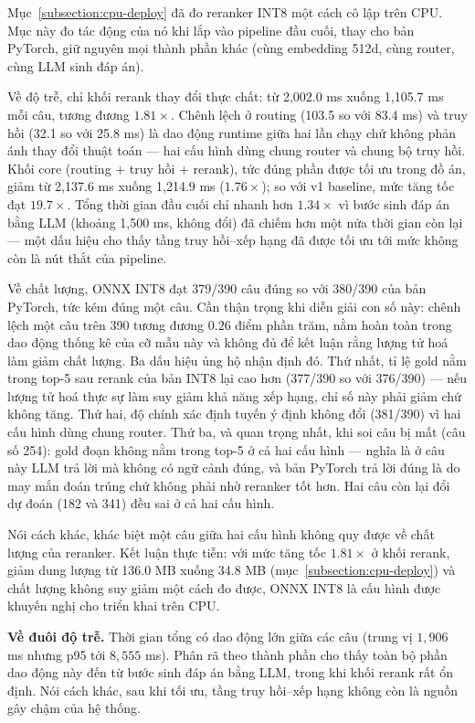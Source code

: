 \documentclass[../DoAn.tex]{subfiles}
\begin{document}
Mục~\ref{subsection:cpu-deploy} đã đo reranker INT8 một cách cô lập trên CPU. Mục này đo tác động của nó khi lắp vào pipeline đầu cuối, thay cho bản PyTorch, giữ nguyên mọi thành phần khác (cùng embedding 512d, cùng router, cùng LLM sinh đáp án).

Về độ trễ, chỉ khối rerank thay đổi thực chất: từ 2,002.0 ms xuống 1,105.7 ms mỗi câu, tương đương $1.81\times$. Chênh lệch ở routing (103.5 so với 83.4 ms) và truy hồi (32.1 so với 25.8 ms) là dao động runtime giữa hai lần chạy chứ không phản ánh thay đổi thuật toán --- hai cấu hình dùng chung router và chung bộ truy hồi. Khối core (routing + truy hồi + rerank), tức đúng phần được tối ưu trong đồ án, giảm từ 2,137.6 ms xuống 1,214.9 ms ($1.76\times$); so với v1 baseline, mức tăng tốc đạt $19.7\times$. Tổng thời gian đầu cuối chỉ nhanh hơn $1.34\times$ vì bước sinh đáp án bằng LLM (khoảng 1,500 ms, không đổi) đã chiếm hơn một nửa thời gian còn lại --- một dấu hiệu cho thấy tầng truy hồi--xếp hạng đã được tối ưu tới mức không còn là nút thắt của pipeline.

Về chất lượng, ONNX INT8 đạt 379/390 câu đúng so với 380/390 của bản PyTorch, tức kém đúng một câu. Cần thận trọng khi diễn giải con số này: chênh lệch một câu trên 390 tương đương $0.26$ điểm phần trăm, nằm hoàn toàn trong dao động thống kê của cỡ mẫu này và không đủ để kết luận rằng lượng tử hoá làm giảm chất lượng. Ba dấu hiệu ủng hộ nhận định đó. Thứ nhất, tỉ lệ gold nằm trong top-5 sau rerank của bản INT8 lại cao hơn (377/390 so với 376/390) --- nếu lượng tử hoá thực sự làm suy giảm khả năng xếp hạng, chỉ số này phải giảm chứ không tăng. Thứ hai, độ chính xác định tuyến ý định không đổi (381/390) vì hai cấu hình dùng chung router. Thứ ba, và quan trọng nhất, khi soi câu bị mất (câu số 254): gold đoạn không nằm trong top-5 ở cả hai cấu hình --- nghĩa là ở câu này LLM trả lời mà không có ngữ cảnh đúng, và bản PyTorch trả lời đúng là do may mắn đoán trúng chứ không phải nhờ reranker tốt hơn. Hai câu còn lại đổi dự đoán (182 và 341) đều sai ở cả hai cấu hình.

Nói cách khác, khác biệt một câu giữa hai cấu hình không quy được về chất lượng của reranker. Kết luận thực tiễn: với mức tăng tốc $1.81\times$ ở khối rerank, giảm dung lượng từ 136.0 MB xuống 34.8 MB (mục~\ref{subsection:cpu-deploy}) và chất lượng không suy giảm một cách đo được, ONNX INT8 là cấu hình được khuyến nghị cho triển khai trên CPU.

\noindent\textbf{Về đuôi độ trễ.} Thời gian tổng có dao động lớn giữa các câu (trung vị $1{,}906$ ms nhưng p95 tới $8{,}555$ ms). Phân rã theo thành phần cho thấy toàn bộ phần dao động này đến từ bước sinh đáp án bằng LLM, trong khi khối rerank rất ổn định. Nói cách khác, sau khi tối ưu, tầng truy hồi--xếp hạng không còn là nguồn gây chậm của hệ thống.
\end{document}
